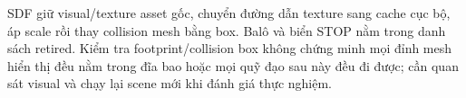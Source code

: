 SDF giữ visual/texture asset gốc, chuyển đường dẫn texture sang cache cục bộ, áp scale rồi thay collision mesh bằng box. Balô và biển STOP nằm trong danh sách retired. Kiểm tra footprint/collision box không chứng minh mọi đỉnh mesh hiển thị đều nằm trong đĩa bao hoặc mọi quỹ đạo sau này đều đi được; cần quan sát visual và chạy lại scene mới khi đánh giá thực nghiệm.
